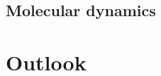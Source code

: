 \documentclass[a4paper,english, 12pt, twoside]{article}
\begin{document}
\subsection{Molecular dynamics}\label{MD}


\section{Outlook}
%   

\printbibliography
\end{document}
